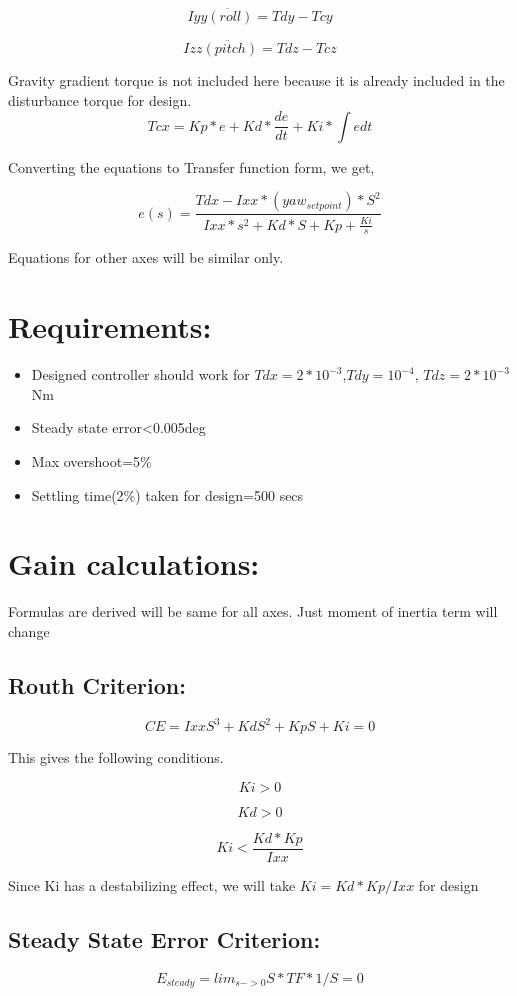 \documentclass[10pt,a4paper]{report}
\begin{document}
\[
Iyy\ddot{(roll)}=Tdy-Tcy
\]

\[
Izz\ddot{(pitch)}=Tdz-Tcz
\]

Gravity gradient torque is not included here because it is already
included in the disturbance torque for design. 
\[
Tcx=Kp*e+Kd*\dfrac{de}{dt}+Ki*\int edt
\]

Converting the equations to Transfer function form, we get,

\[
e(s)=\frac{Tdx-Ixx*(yaw_{setpoint})*S^{2}}{Ixx*s^{2}+Kd*S+Kp+\frac{Ki}{s}}
\]

Equations for other axes will be similar only.

\section{Requirements:}
\begin{itemize}
	\item Designed controller should work for $Tdx=2*10^{-3}$,$Tdy=10^{-4}$,
	$Tdz=2*10^{-3}$Nm
	\item Steady state error<0.005deg
	\item Max overshoot=5\%
	\item Settling time(2\%) taken for design=500 secs
\end{itemize}
\section{Gain calculations:}

Formulas are derived will be same for all axes. Just moment of inertia
term will change

\subsection{Routh Criterion:}

\[
CE=IxxS^{3}+KdS^{2}+KpS+Ki=0
\]

This gives the following conditions.

\[
Ki>0
\]

\[
Kd>0
\]

\[
Ki<\frac{Kd*Kp}{Ixx}
\]

Since Ki has a destabilizing effect, we will take $Ki=Kd*Kp/Ixx$
for design

\subsection{Steady State Error Criterion:}

\[
E_{steady}=lim_{s->0}S*TF*1/S=0
\]
\end{document}
